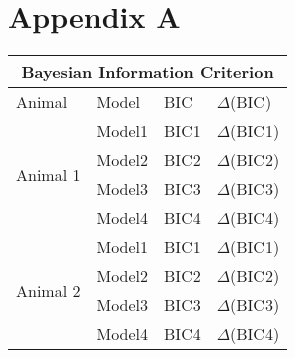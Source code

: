 \appendix
\chapter{Appendix A}
\begin{table}[h!]
    \centering
\begin{tabular}{ |p{3cm}||p{3cm}|p{2cm}|p{2cm}| }
 \hline
 \multicolumn{4}{|c|}{Bayesian Information Criterion} \\
 \hline
 Animal & Model & BIC & $\Delta$(BIC)\\
 \hline
\multirow{4}{6cm}{Animal 1} &Model1&BIC1&$\Delta$(BIC1)\\&Model2&BIC2&$\Delta$(BIC2)\\&Model3&BIC3&$\Delta$(BIC3)\\&Model4&BIC4&$\Delta$(BIC4)\\
\hline
\multirow{4}{6cm}{Animal 2} &Model1&BIC1&$\Delta$(BIC1)\\&Model2&BIC2&$\Delta$(BIC2)\\&Model3&BIC3&$\Delta$(BIC3)\\&Model4&BIC4&$\Delta$(BIC4)\\
 \hline
\end{tabular}
\end{table}